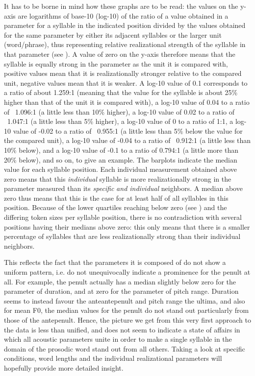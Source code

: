 \documentclass[output=paper]{LSP/langsci}
\begin{document}
{\begin{samepage}
It has to be borne in mind how these graphs are to be read: the values on the y-axis are logarithms of base-10 (log-10) of the ratio of a value obtained in a parameter for a syllable in the indicated position divided by the values obtained for the same parameter by either its adjacent syllables or the larger unit (word/phrase), thus representing relative realizational strength of the syllable in that parameter (see ). A value of zero on the y-axis therefore means that the syllable is equally strong in the parameter as the unit it is compared with, positive values mean that it is realizationally stronger relative to the compared unit, negative values mean that it is weaker. A log-10 value of 0.1 corresponds to a ratio of about 1.259:1 (meaning that the value for the syllable is about 25\% higher than that of the unit it is compared with), a log-10 value of 0.04 to a ratio of ~1.096:1 (a little less than 10\% higher), a log-10 value of 0.02 to a ratio of ~1.047:1 (a little less than 5\% higher), a log-10 value of 0 to a ratio of 1:1, a log-10 value of -0.02 to a ratio of ~0.955:1 (a little less than 5\% below the value for the compared unit), a log-10 value of -0.04 to a ratio of ~0.912:1 (a little less than 10\% below), and a log-10 value of -0.1 to a ratio of 0.794:1 (a little more than 20\% below), and so on, to give an example. The barplots indicate the median value for each syllable position. Each individual measurement obtained above zero means that this \textit{individual} syllable is more realizationally strong in the parameter measured than its \textit{specific} \textit{and individual} neighbors. A median above zero thus means that this is the case for at least half of all syllables in this position. Because of the lower quartiles reaching below zero (see ) and the differing token sizes per syllable position, there is no contradiction with several positions having their medians above zero: this only means that there is a smaller percentage of syllables that are less realizationally strong than their individual neighbors.
\end{samepage}
}
This reflects the fact that the parameters it is composed of do not show a uniform pattern, i.e. do not unequivocally indicate a prominence for the penult at all. For example, the penult actually has a median slightly below zero for the parameter of duration, and at zero for the parameter of pitch range. Duration seems to instead favour the anteantepenult and pitch range the ultima, and also for mean F0, the median values for the penult do not stand out particularly from those of the antepenult. Hence, the picture we get from this very first approach to the data is less than unified, and does not seem to indicate a state of affairs in which all acoustic parameters unite in order to make a single syllable in the domain of the prosodic word stand out from all others. Taking a look at specific conditions, word lengths and the individual realizational parameters will hopefully provide more detailed insight.
\end{document}
